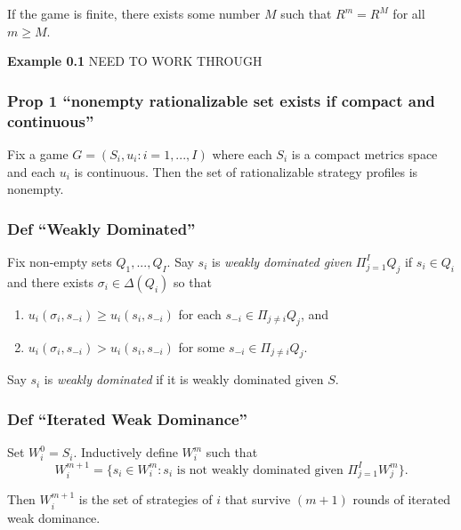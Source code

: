 \documentclass[
]{article}
\providecommand{\tightlist}{%
  \setlength{\itemsep}{0pt}\setlength{\parskip}{0pt}}
\begin{document}
If the game is finite, there exists some number \(M\) such that
\(R^m = R^M\) for all \(m \geq M\).

\textbf{Example 0.1} NEED TO WORK THROUGH

\hypertarget{prop-1-nonempty-rationalizable-set-exists-if-compact-and-continuous}{%
\subsubsection{Prop 1 ``nonempty rationalizable set exists if compact
and
continuous''}\label{prop-1-nonempty-rationalizable-set-exists-if-compact-and-continuous}}

Fix a game \(G = (S_i, u_i: i = 1, ..., I)\) where each \(S_i\) is a
compact metrics space and each \(u_i\) is continuous. Then the set of
rationalizable strategy profiles is nonempty.

\hypertarget{def-weakly-dominated}{%
\subsubsection{Def ``Weakly Dominated''}\label{def-weakly-dominated}}

Fix non-empty sets \(Q_1, ..., Q_I\). Say \(s_i\) is \emph{weakly
dominated given} \(\Pi_{j=1}^I Q_j\) if \(s_i \in Q_i\) and there exists
\(\sigma_i \in \Delta(Q_i)\) so that

\begin{enumerate}
\def\labelenumi{\arabic{enumi}.}
\tightlist
\item
  \(u_i(\sigma_i, s_{-i}) \geq u_i(s_i, s_{-i})\) for each
  \(s_{-i} \in \Pi_{j\neq i} Q_j\), and
\item
  \(u_i(\sigma_i, s_{-i}) > u_i(s_i, s_{-i})\) for some
  \(s_{-i} \in \Pi_{j\neq i} Q_j\).
\end{enumerate}

Say \(s_i\) is \emph{weakly dominated} if it is weakly dominated given
\(S\).

\hypertarget{def-iterated-weak-dominance}{%
\subsubsection{Def ``Iterated Weak
Dominance''}\label{def-iterated-weak-dominance}}

Set \(W_i^0 = S_i\). Inductively define \(W_i^m\) such that
\[W_i^{m+1} = \{s_i \in W_i^m: s_i \text{ is not weakly dominated given } \Pi^{I}_{j=1}W_j^m\}.\]

Then \(W_i^{m+1}\) is the set of strategies of \(i\) that survive
\((m+1)\) rounds of iterated weak dominance.
\end{document}
